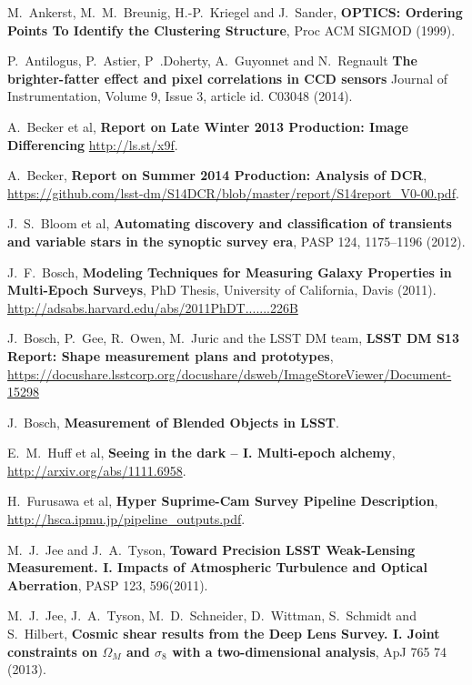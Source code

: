 \documentclass[12pt]{article}
\begin{document}
\clearpage

\begin{thebibliography}{10}

 M.~Ankerst, M.~M.~Breunig, H.-P.~Kriegel and J.~Sander,
  \textbf{OPTICS: Ordering Points To Identify the Clustering Structure},
  Proc ACM SIGMOD (1999).

 P.~Antilogus, P.~Astier, P~.Doherty, A.~Guyonnet and N.~Regnault
  \textbf{The brighter-fatter effect and pixel correlations in CCD sensors}
  Journal of Instrumentation, Volume 9, Issue 3, article id. C03048 (2014).

 A.~Becker et al,
  \textbf{Report on Late Winter 2013 Production: Image Differencing}
  \url{http://ls.st/x9f}.

 A.~Becker,
  \textbf{Report on Summer 2014 Production: Analysis of DCR},
  \url{https://github.com/lsst-dm/S14DCR/blob/master/report/S14report_V0-00.pdf}.

 J.~S.~Bloom et al,
  \textbf{Automating discovery and classification of transients and variable stars in the synoptic survey era},
  PASP 124, 1175--1196 (2012).

 J.~F.~Bosch,
  \textbf{Modeling Techniques for Measuring Galaxy Properties in Multi-Epoch Surveys},
  PhD Thesis, University of California, Davis (2011). \url{http://adsabs.harvard.edu/abs/2011PhDT.......226B}

 J.~Bosch, P.~Gee, R.~Owen, M.~Juric and the LSST DM team,
  \textbf{LSST DM S13 Report: Shape measurement plans and prototypes},
  \url{https://docushare.lsstcorp.org/docushare/dsweb/ImageStoreViewer/Document-15298}

 J.~Bosch,
  \textbf{Measurement of Blended Objects in LSST}.

 E.~M.~Huff et al,
  \textbf{Seeing in the dark -- I. Multi-epoch alchemy},
  \url{http://arxiv.org/abs/1111.6958}.

 H.~Furusawa et al,
  \textbf{Hyper Suprime-Cam Survey Pipeline Description},
  \url{http://hsca.ipmu.jp/pipeline_outputs.pdf}.

 M.~J.~Jee and J.~A.~Tyson,  \textbf{Toward
  Precision LSST Weak-Lensing Measurement. I. Impacts of Atmospheric
  Turbulence and Optical Aberration}, PASP 123, 596(2011).

 M.~J.~Jee, J.~A.~Tyson, M.~D.~Schneider, D.~Wittman, S.~Schmidt and S.~Hilbert,
  \textbf{Cosmic shear results from the Deep Lens Survey. I. Joint constraints on $\Omega_M$ and $\sigma_8$ with a two-dimensional analysis},
  ApJ 765 74 (2013).


\end{thebibliography}
\end{document}
